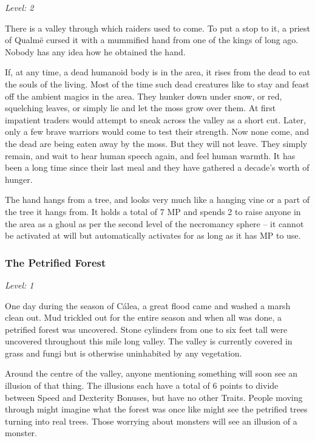 \begin{multicols}{2}
\textit{Level: 2}

There is a valley through which raiders used to come.  To put a stop to it, a priest of Qualm\"{e} cursed it with a mummified hand from one of the kings of long ago.  Nobody has any idea how he obtained the hand.

If, at any time, a dead humanoid body is in the area, it rises from the dead to eat the souls of the living.  Most of the time such dead creatures like to stay and feast off the ambient magics in the area.  They hunker down under snow, or red, squelching leaves, or simply lie and let the moss grow over them.   At first impatient traders would attempt to sneak across the valley as a short cut.  Later, only a few brave warriors would come to test their strength.  Now none come, and the dead are being eaten away by the moss.  But they will not leave.  They simply remain, and wait to hear human speech again, and feel human warmth.  It has been a long time since their last meal and they have gathered a decade's worth of hunger.

The hand hangs from a tree, and looks very much like a hanging vine or a part of the tree it hangs from.  It holds a total of 7 MP and spends 2 to raise anyone in the area as a ghoul as per the second level of the necromancy sphere -- it cannot be activated at will but automatically activates for as long as it has MP to use.

\subsubsection{The Petrified Forest}

\textit{Level: 1}

One day during the season of C\'{a}lea, a great flood came and washed a marsh clean out.  Mud trickled out for the entire season and when all was done, a petrified forest was uncovered.  Stone cylinders from one to six feet tall were uncovered throughout this mile long valley.  The valley is currently covered in grass and fungi but is otherwise uninhabited by any vegetation.

Around the centre of the valley, anyone mentioning something will soon see an illusion of that thing.  The illusions each have a total of 6 points to divide between Speed and Dexterity Bonuses, but have no other Traits.  People moving through might imagine what the forest was once like might see the petrified trees turning into real trees.  Those worrying about monsters will see an illusion of a monster.


\end{multicols}
